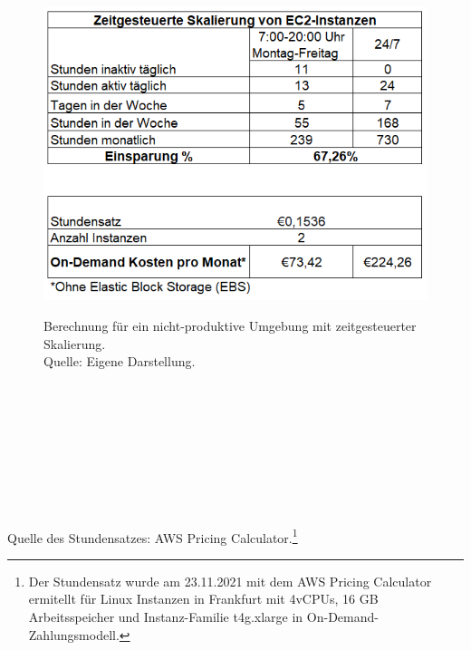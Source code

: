 \begin{figure}[h]
  \centering
  \includegraphics[scale=0.8]{sources/Einsparung_Zeitgesteuerte_Skalierung}
  \caption[Berechnung für ein nicht produktives Umgebung mit zeitgesteuerter Skalierung]{}
  \label{fig:Einsparung_Zeitgesteuerte_Skalierung} 
  Berechnung für ein nicht-produktive Umgebung mit zeitgesteuerter Skalierung. \\
  Quelle: Eigene Darstellung.
\end{figure}
\\\\
\\\\
\\\\
\\\\ 
Quelle des Stundensatzes: AWS Pricing Calculator.\footnote{Der Stundensatz wurde am 23.11.2021 mit dem AWS Pricing Calculator ermitellt für Linux Instanzen in Frankfurt mit 4vCPUs, 16 GB Arbeitsspeicher und Instanz-Familie t4g.xlarge in On-Demand-Zahlungsmodell\cite{AMZ17}.}
\newpage
